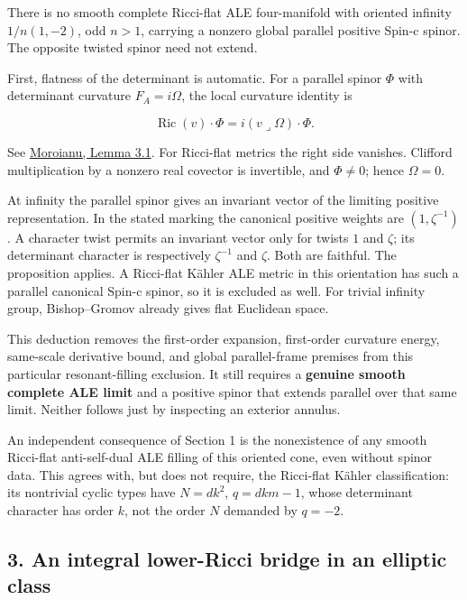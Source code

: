 \documentclass[
  10pt,
]{article}
\begin{document}
There is no smooth complete Ricci-flat ALE four-manifold with oriented
infinity \(1/n(1,-2)\), odd \(n>1\), carrying a nonzero global parallel
positive Spin-c spinor. The opposite twisted spinor need not extend.

First, flatness of the determinant is automatic. For a parallel spinor
\(\Phi\) with determinant curvature \(F_A=i\Omega\), the local curvature
identity is

\[
 \operatorname{Ric}(v)\cdot\Phi
                      =i(v\mathbin{\lrcorner}\Omega)\cdot\Phi.
                                                        \tag{2.1}
\]

See \href{https://moroianu.perso.math.cnrs.fr/tex/1997cmp.pdf}{Moroianu,
Lemma 3.1}. For Ricci-flat metrics the right side vanishes. Clifford
multiplication by a nonzero real covector is invertible, and
\(\Phi\ne0\); hence \(\Omega=0\).

At infinity the parallel spinor gives an invariant vector of the
limiting positive representation. In the stated marking the canonical
positive weights are \((1,\zeta^{-1})\). A character twist permits an
invariant vector only for twists \(1\) and \(\zeta\); its determinant
character is respectively \(\zeta^{-1}\) and \(\zeta\). Both are
faithful. The proposition applies. A Ricci-flat Kähler ALE metric in
this orientation has such a parallel canonical Spin-c spinor, so it is
excluded as well. For trivial infinity group, Bishop--Gromov already
gives flat Euclidean space.

This deduction removes the first-order expansion, first-order curvature
energy, same-scale derivative bound, and global parallel-frame premises
from this particular resonant-filling exclusion. It still requires a
\textbf{genuine smooth complete ALE limit} and a positive spinor that
extends parallel over that same limit. Neither follows just by
inspecting an exterior annulus.

An independent consequence of Section 1 is the nonexistence of any
smooth Ricci-flat anti-self-dual ALE filling of this oriented cone, even
without spinor data. This agrees with, but does not require, the
Ricci-flat Kähler classification: its nontrivial cyclic types have
\(N=dk^2\), \(q=dkm-1\), whose determinant character has order \(k\),
not the order \(N\) demanded by \(q=-2\).

\hypertarget{an-integral-lower-ricci-bridge-in-an-elliptic-class}{%
\subsection{3. An integral lower-Ricci bridge in an elliptic
class}\label{an-integral-lower-ricci-bridge-in-an-elliptic-class}}
\end{document}
